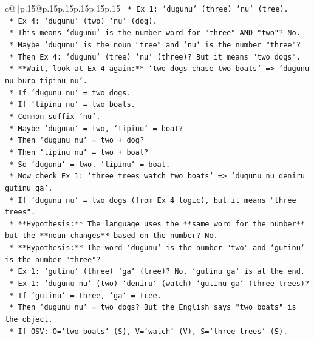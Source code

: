 \documentclass{article}
\begin{document}
{\begin{supertabular}{c@{$\;$}|p{.15\linewidth}@{}p{.15\linewidth}p{.15\linewidth}p{.15\linewidth}p{.15\linewidth}p{.15\linewidth}}
{{{\texttt{        *   Ex 1: `dugunu` (three) `nu` (tree).} \\
\texttt{        *   Ex 4: `dugunu` (two) `nu` (dog).} \\
\texttt{        *   This means `dugunu` is the number word for "three" AND "two"? No.} \\
\texttt{        *   Maybe `dugunu` is the noun "tree" and `nu` is the number "three"?} \\
\texttt{        *   Then Ex 4: `dugunu` (tree) `nu` (three)? But it means "two dogs".} \\
\texttt{        *   **Wait, look at Ex 4 again:** `two dogs chase two boats` => `dugunu nu buro tipinu nu`.} \\
\texttt{        *   If `dugunu nu` = two dogs.} \\
\texttt{        *   If `tipinu nu` = two boats.} \\
\texttt{        *   Common suffix `nu`.} \\
\texttt{        *   Maybe `dugunu` = two, `tipinu` = boat?} \\
\texttt{        *   Then `dugunu nu` = two + dog?} \\
\texttt{        *   Then `tipinu nu` = two + boat?} \\
\texttt{        *   So `dugunu` = two. `tipinu` = boat.} \\
\texttt{        *   Now check Ex 1: `three trees watch two boats` => `dugunu nu deniru gutinu ga`.} \\
\texttt{        *   If `dugunu nu` = two dogs (from Ex 4 logic), but it means "three trees".} \\
\texttt{        *   **Hypothesis:** The language uses the **same word for the number** but the **noun changes** based on the number? No.} \\
\texttt{        *   **Hypothesis:** The word `dugunu` is the number "two" and `gutinu` is the number "three"?} \\
\texttt{        *   Ex 1: `gutinu` (three) `ga` (tree)? No, `gutinu ga` is at the end.} \\
\texttt{        *   Ex 1: `dugunu nu` (two) `deniru` (watch) `gutinu ga` (three trees)?} \\
\texttt{        *   If `gutinu` = three, `ga` = tree.} \\
\texttt{        *   Then `dugunu nu` = two dogs? But the English says "two boats" is the object.} \\
\texttt{        *   If OSV: O=`two boats` (S), V=`watch` (V), S=`three trees` (S).} \\
}}}
\end{supertabular}}
\end{document}
